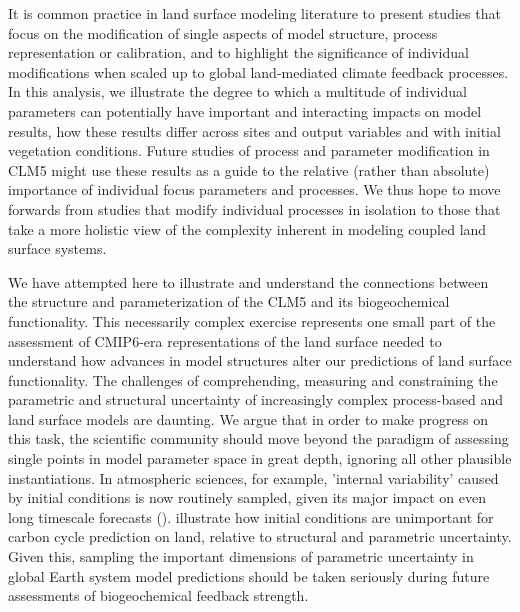 \documentclass[draft,linenumbers]{agujournal}
\begin{document}
It is common practice in land surface modeling literature to present studies that focus on the modification of single aspects of model structure, process representation or calibration, and to highlight the significance of individual modifications when scaled up to global land-mediated climate feedback processes. In this analysis, we illustrate the degree to which a multitude of individual parameters can potentially have important and interacting impacts on model results, how these results differ across sites and output variables and with initial vegetation conditions.  Future studies of process and parameter modification in CLM5 might use these results as a guide to the relative (rather than absolute) importance of individual focus parameters and processes. We thus hope to move forwards from studies that modify individual processes in isolation to those that take a more holistic view of the complexity inherent in modeling coupled land surface systems.

We have attempted here to illustrate and understand the connections between the structure and parameterization of the CLM5 and its biogeochemical functionality. This necessarily complex exercise represents one small part of the assessment of CMIP6-era representations of the land surface needed to understand how advances in model structures alter our predictions of land surface functionality.  The challenges of comprehending, measuring and constraining the parametric and structural uncertainty of increasingly complex process-based and land surface models are daunting. We argue that in order to make progress on this task, the scientific community should move beyond the paradigm of assessing single points in model parameter space in great depth, ignoring all other plausible instantiations. In atmospheric sciences, for example, 'internal variability' caused by initial conditions is now routinely sampled, given its major impact on even long timescale forecasts (\cite{kay2015}). \cite{bonan2018} illustrate how initial conditions are unimportant for carbon cycle prediction on land, relative to structural and parametric uncertainty. Given this, sampling the important dimensions of parametric uncertainty in global Earth system model predictions should be taken seriously during future assessments of biogeochemical feedback strength.
\end{document}
